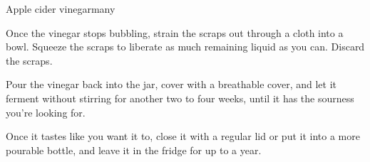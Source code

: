 \documentclass{article}
\begin{document}
\begin{recipe}{Apple cider vinegar}{many}
    \begin{step}
      \begin{ingrs}
      \end{ingrs}
      \begin{stepdesc}
        Once the vinegar stops bubbling, strain the scraps out through a cloth into a bowl. Squeeze the scraps to liberate as much remaining liquid as you can. Discard the scraps.
      \end{stepdesc}
    \end{step}
    \begin{step}
      \begin{ingrs}
      \end{ingrs}
      \begin{stepdesc}
        Pour the vinegar back into the jar, cover with a breathable cover, and let it ferment without stirring for another two to four weeks, until it has the sourness you're looking for.
      \end{stepdesc}
    \end{step}
    \begin{step}
      \begin{ingrs}
      \end{ingrs}
      \begin{stepdesc}
        Once it tastes like you want it to, close it with a regular lid or put it into a more pourable bottle, and leave it in the fridge for up to a year.
      \end{stepdesc}
    \end{step}
  \end{recipe}
\end{document}
